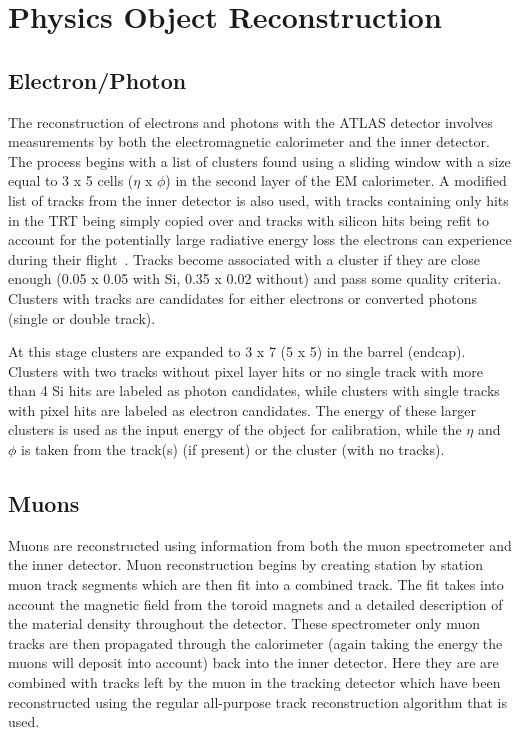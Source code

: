 \chapter{Physics Object Reconstruction}
\label{Reco}

\section{Electron/Photon}
The reconstruction of electrons and photons with the ATLAS detector involves measurements by both the electromagnetic calorimeter and the inner detector.  
The process begins with a list of clusters found using a sliding window with a size equal to 3 x 5 cells ($\eta$ x $\phi$) in the second layer of the EM calorimeter.  
A modified list of tracks from the inner detector is also used, with tracks containing only hits in the TRT being simply copied over and tracks with silicon hits being refit to account for the potentially large radiative energy loss the electrons can experience during their flight~\cite{ATLAS-CONF-2012-047}.  
Tracks become associated with a cluster if they are close enough (0.05 x 0.05 with Si, 0.35 x 0.02 without) and pass some quality criteria.  
Clusters with tracks are candidates for either electrons or converted photons (single or double track).  

At this stage clusters are expanded to 3 x 7 (5 x 5) in the barrel (endcap).  
Clusters with two tracks without pixel layer hits or no single track with more than 4 Si hits are labeled as photon candidates, while clusters with single tracks with pixel hits are labeled as electron candidates.  
The energy of these larger clusters is used as the input energy of the object for calibration, while the $\eta$ and $\phi$ is taken from the track(s) (if present) or the cluster (with no tracks).  

\section{Muons}
\label{Muons}

Muons are reconstructed using information from both the muon spectrometer and the inner detector.  
Muon reconstruction begins by creating station by station muon track segments which are then fit into a combined track.  
The fit takes into account the magnetic field from the toroid magnets and a detailed description of the material density throughout the detector.  
These spectrometer only muon tracks are then propagated through the calorimeter (again taking the energy the muons will deposit into account) back into the inner detector.  
Here they are are combined with tracks left by the muon in the tracking detector which have been reconstructed using the regular all-purpose track reconstruction algorithm that is used.  


